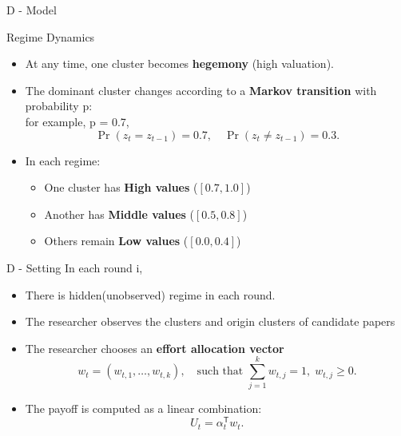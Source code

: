 \documentclass{beamer}
\begin{document}
\begin{frame}{D - Model}
    \begin{block}{Regime Dynamics}
    \begin{itemize}
        \item At any time, one cluster becomes \textbf{hegemony} (high valuation).
        \item The dominant cluster changes according to a \textbf{Markov transition} with probability p:\\
        for example, p = 0.7, 
              \[
              \Pr(z_t = z_{t-1}) = 0.7, \quad 
              \Pr(z_t \neq z_{t-1}) = 0.3.
              \]
        \item In each regime:
              \begin{itemize}
                  \item One cluster has \textbf{High values} ($[0.7, 1.0]$)
                  \item Another has \textbf{Middle values} ($[0.5, 0.8]$)
                  \item Others remain \textbf{Low values} ($[0.0, 0.4]$)
              \end{itemize}
    \end{itemize}
    \end{block}
\end{frame}


\begin{frame}{D - Setting}
    In each round i, 
    \begin{itemize}
        \item There is hidden(unobserved) regime in each round.
        \item The researcher observes the clusters and origin clusters of candidate papers 
        \item The researcher chooses an \textbf{effort allocation vector}
              \[
              w_t = (w_{t,1}, \ldots, w_{t,k}), 
              \quad \text{such that } \sum_{j=1}^{k} w_{t,j} = 1,\; w_{t,j} \ge 0.
              \]
        \item The payoff is computed as a linear combination:
              \[
              U_t = \alpha_t^{\mathsf{T}} w_t.
              \]
    \end{itemize}
\end{frame}
\end{document}

